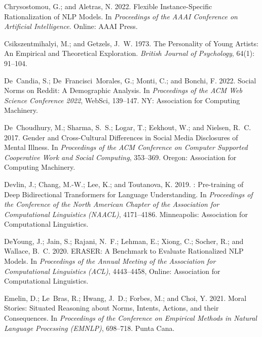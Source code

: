 \documentclass[letterpaper]{article} %
\begin{document}
\begin{thebibliography}{46}
Chrysostomou, G.; and Aletras, N. 2022.
\newblock Flexible Instance-Specific Rationalization of {NLP} Models.
\newblock In \emph{Proceedings of the AAAI Conference on Artificial Intelligence}. Online: AAAI Press.

Csikszentmihalyi, M.; and Getzels, J.~W. 1973.
\newblock The Personality of Young Artists: An Empirical and Theoretical Exploration.
\newblock \emph{British Journal of Psychology}, 64(1): 91--104.

De~Candia, S.; De~Francisci~Morales, G.; Monti, C.; and Bonchi, F. 2022.
\newblock Social Norms on {Reddit}: {A} Demographic Analysis.
\newblock In \emph{Proceedings of the ACM Web Science Conference 2022}, WebSci, 139--147. NY:
  Association for Computing Machinery.

De~Choudhury, M.; Sharma, S.~S.; Logar, T.; Eekhout, W.; and Nielsen, R.~C.
  2017.
\newblock Gender and Cross-Cultural Differences in Social Media Disclosures of
  Mental Illness.
\newblock In \emph{Proceedings of the ACM Conference on Computer Supported Cooperative Work
  and Social Computing}, 353--369. Oregon: Association for Computing Machinery.

Devlin, J.; Chang, M.-W.; Lee, K.; and Toutanova, K. 2019.
: {Pre-training} of Deep Bidirectional Transformers for
  Language Understanding.
\newblock In \emph{Proceedings of the Conference of the North American Chapter of the Association for Computational Linguistics (NAACL)}, 4171--4186.
  Minneapolis: Association for Computational Linguistics.

DeYoung, J.; Jain, S.; Rajani, N.~F.; Lehman, E.; Xiong, C.; Socher, R.; and
  Wallace, B.~C. 2020.
\newblock ERASER: {A} Benchmark to Evaluate Rationalized NLP Models.
\newblock In \emph{Proceedings of the Annual Meeting of the Association for Computational Linguistics (ACL)}, 4443--4458, Online: Association for Computational Linguistics.

Emelin, D.; Le~Bras, R.; Hwang, J.~D.; Forbes, M.; and Choi, Y. 2021.
\newblock Moral Stories: Situated Reasoning about Norms, Intents, Actions, and
  their Consequences.
\newblock In \emph{Proceedings of the Conference on Empirical Methods in Natural Language Processing (EMNLP)}, 698--718. Punta Cana.


\end{thebibliography}
\end{document}
